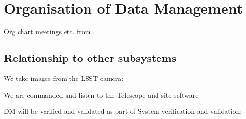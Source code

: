 
\section{Organisation of Data Management} \label{sec:org}
Org chart meetings etc. from \cite{LDM-294}.

\subsection{Relationship to other subsystems}
   We take images from the  LSST camera: \cite{2010SPIE.7735E..0JK}

   We are commanded and listen to the  Telescope  and site software  \cite{2014SPIE.9145E..1AG}


   DM will be verified and validated as part of System verification and validation: \cite{2014SPIE.9150E..0NS}
